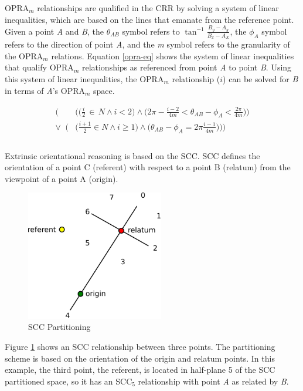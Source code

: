 \documentclass[12pt]{ucthesis}
\begin{document}
OPRA$_{m}$ relationships are qualified in the CRR by solving a system of linear inequalities, which are based on the lines that emanate from the reference point. Given a point \emph{A} and \emph{B}, the $\theta_{AB}$ symbol refers to $ \tan^{-1} \frac{B_{y} - A_{y}}{B_{x} - A_{X}} $, the $\phi_{A}$ symbol refers to the direction of point \emph{A}, and the \emph{m} symbol refers to the granularity of the OPRA$_{m}$ relations. Equation \ref{opra-eq} shows the system of linear inequalities that qualify OPRA$_{m}$ relationships as referenced from point \emph{A} to point \emph{B}. Using this system of linear inequalities, the OPRA$_{m}$ relationship ($i$) can be solved for \emph{B} in terms of \emph{A}'s OPRA$_{m}$ space.

\begin{equation}\label{opra-eq}
\begin{aligned}
\Big(&\Big(\Big(\frac{i}{2} \, \in \, N \wedge i < 2\Big) \wedge \Big(2\pi - \frac{i-2}{4m} < \theta_{AB} - \phi_{A} < \frac{2\pi}{4m}\Big)\Big) \\
\lor \;\; \Big(&\Big(\frac{i+1}{2} \in N \wedge i \geq 1\Big) \wedge \Big(\theta_{AB} - \phi_{A} = 2\pi \frac{i-1}{4m}\Big)\Big)\Big) \\ \\
\end{aligned}
\end{equation}

Extrinsic orientational reasoning is based on the SCC. SCC defines the orientation of a point C (referent) with respect to a point B (relatum) from the viewpoint of a point A (origin).

\begin{figure}[H]
\centering
\includegraphics[width=60mm]{scc}
\caption{SCC Partitioning}
\label{scc}
\end{figure}

Figure \ref{scc} shows an SCC relationship between three points. The partitioning scheme is based on the orientation of the origin and relatum points. In this example, the third point, the referent, is located in half-plane 5 of the SCC partitioned space, so it has an SCC$_{5}$ relationship with point \emph{A} as related by \emph{B}. 
\end{document}
